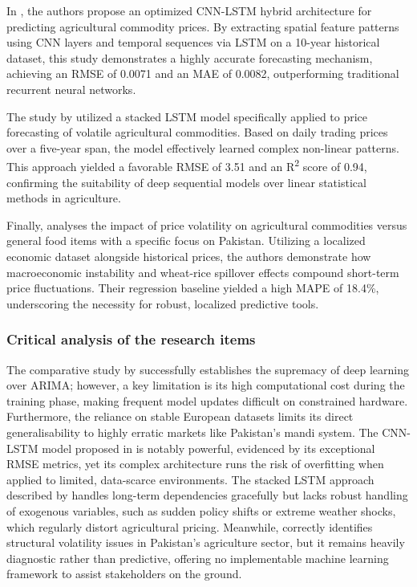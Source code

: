 In \cite{zhang2023agricultural}, the authors propose an optimized CNN-LSTM hybrid architecture for predicting agricultural commodity prices. By extracting spatial feature patterns using CNN layers and temporal sequences via LSTM on a 10-year historical dataset, this study demonstrates a highly accurate forecasting mechanism, achieving an RMSE of 0.0071 and an MAE of 0.0082, outperforming traditional recurrent neural networks.

The study by \cite{jadhav2021price} utilized a stacked LSTM model specifically applied to price forecasting of volatile agricultural commodities. Based on daily trading prices over a five-year span, the model effectively learned complex non-linear patterns. This approach yielded a favorable RMSE of 3.51 and an R\textsuperscript{2} score of 0.94, confirming the suitability of deep sequential models over linear statistical methods in agriculture.

Finally, \cite{habib2021price} analyses the impact of price volatility on agricultural commodities versus general food items with a specific focus on Pakistan. Utilizing a localized economic dataset alongside historical prices, the authors demonstrate how macroeconomic instability and wheat-rice spillover effects compound short-term price fluctuations. Their regression baseline yielded a high MAPE of 18.4\%, underscoring the necessity for robust, localized predictive tools.

\subsubsection{Critical analysis of the research items}
The comparative study by \cite{menculini2021comparing} successfully establishes the supremacy of deep learning over ARIMA; however, a key limitation is its high computational cost during the training phase, making frequent model updates difficult on constrained hardware. Furthermore, the reliance on stable European datasets limits its direct generalisability to highly erratic markets like Pakistan's mandi system. The CNN-LSTM model proposed in \cite{zhang2023agricultural} is notably powerful, evidenced by its exceptional RMSE metrics, yet its complex architecture runs the risk of overfitting when applied to limited, data-scarce environments. The stacked LSTM approach described by \cite{jadhav2021price} handles long-term dependencies gracefully but lacks robust handling of exogenous variables, such as sudden policy shifts or extreme weather shocks, which regularly distort agricultural pricing. Meanwhile, \cite{habib2021price} correctly identifies structural volatility issues in Pakistan's agriculture sector, but it remains heavily diagnostic rather than predictive, offering no implementable machine learning framework to assist stakeholders on the ground.


